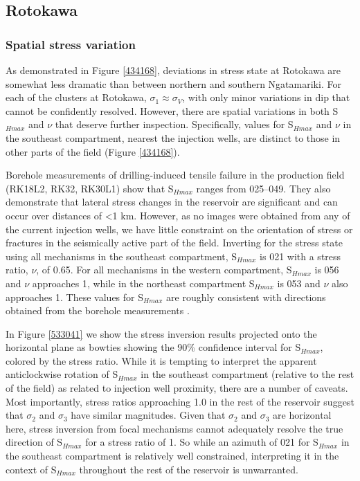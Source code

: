 \subsection{Rotokawa}
\subsubsection{Spatial stress variation}
As demonstrated in Figure \ref{434168}, deviations in stress state at Rotokawa are somewhat less dramatic than between northern and southern Ngatamariki. For each of the clusters at Rotokawa, $\sigma_{1}\approx{\sigma_{V}}$, with only minor variations in dip that cannot be confidently resolved. However, there are spatial variations in both S$_{Hmax}$ and $\nu$ that deserve further inspection. Specifically, values for S$_{Hmax}$ and $\nu$ in the southeast compartment, nearest the injection wells, are distinct to those in other parts of the field (Figure \ref{434168}).

Borehole measurements of drilling-induced tensile failure in the production field (RK18L2, RK32, RK30L1) \citep{McNamara_2015} show that S$_{Hmax}$ ranges from 025--049\textdegree{}. They also demonstrate that lateral stress changes in the reservoir are significant and can occur over distances of \textless{1} km. However, as no images were obtained from any of the current injection wells, we have little constraint on the orientation of stress or fractures in the seismically active part of the field. Inverting for the stress state using all mechanisms in the southeast compartment, S$_{Hmax}$ is 021\textdegree{} with a stress ratio, $\nu$, of 0.65. For all mechanisms in the western compartment, S$_{Hmax}$ is 056\textdegree{} and $\nu$ approaches 1, while in the northeast compartment S$_{Hmax}$ is 053\textdegree{} and $\nu$ also approaches 1. These values for S$_{Hmax}$ are roughly consistent with directions obtained from the borehole measurements \citep{McNamara_2015}.

In Figure \ref{533041} we show the stress inversion results projected onto the horizontal plane as bowties showing the 90\% confidence interval for S$_{Hmax}$, colored by the stress ratio. While it is tempting to interpret the apparent anticlockwise rotation of S$_{Hmax}$ in the southeast compartment (relative to the rest of the field) as related to injection well proximity, there are a number of caveats. Most importantly, stress ratios approaching 1.0 in the rest of the reservoir suggest that $\sigma_{2}$ and $\sigma_{3}$ have similar magnitudes. Given that $\sigma_{2}$ and $\sigma_{3}$ are horizontal here, stress inversion from focal mechanisms cannot adequately resolve the true direction of S$_{Hmax}$ for a stress ratio of 1. So while an azimuth of 021\textdegree{} for S$_{Hmax}$ in the southeast compartment is relatively well constrained, interpreting it in the context of S$_{Hmax}$ throughout the rest of the reservoir is unwarranted.

